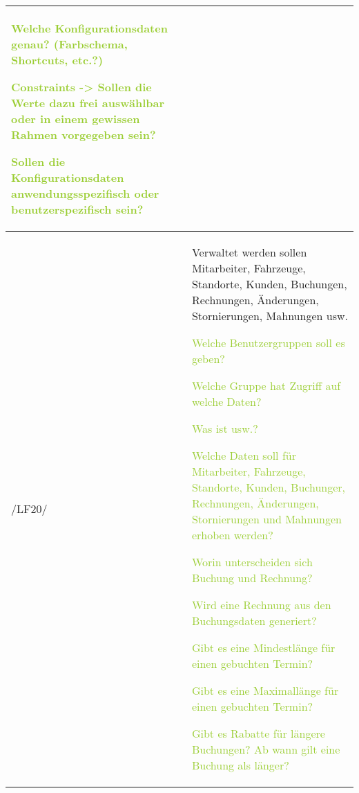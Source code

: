 \begin{tabular}{l | p{13cm}}
    \textcolor{NavyBlue}{}

    \textcolor{YellowGreen}{Welche Konfigurationsdaten genau? (Farbschema, Shortcuts, etc.?)}

    \textcolor{NavyBlue}{}

    \textcolor{YellowGreen}{Constraints -> Sollen die Werte dazu frei auswählbar oder in einem gewissen Rahmen vorgegeben sein?}

    \textcolor{NavyBlue}{}

    \textcolor{YellowGreen}{Sollen die Konfigurationsdaten anwendungsspezifisch oder benutzerspezifisch sein?} 
    
    \textcolor{NavyBlue}{}
    \\
    \hline
    /LF20/ & Verwaltet werden sollen Mitarbeiter, Fahrzeuge, Standorte, Kunden, Buchungen, Rechnungen, Änderungen, Stornierungen, Mahnungen usw.

    \textcolor{YellowGreen}{Welche Benutzergruppen soll es geben?}

    \textcolor{NavyBlue}{}

    \textcolor{YellowGreen}{Welche Gruppe hat Zugriff auf welche Daten?}

    \textcolor{NavyBlue}{}

    \textcolor{YellowGreen}{Was ist usw.?}

    \textcolor{NavyBlue}{}

    \textcolor{YellowGreen}{Welche Daten soll für Mitarbeiter, Fahrzeuge, Standorte, Kunden, Buchunger, Rechnungen, Änderungen, Stornierungen und Mahnungen erhoben werden?}

    \textcolor{NavyBlue}{}

    \textcolor{YellowGreen}{Worin unterscheiden sich Buchung und Rechnung?}

    \textcolor{NavyBlue}{}

    \textcolor{YellowGreen}{Wird eine Rechnung aus den Buchungsdaten generiert?}

    \textcolor{NavyBlue}{}

    \textcolor{YellowGreen}{Gibt es eine Mindestlänge für einen gebuchten Termin?}

    \textcolor{NavyBlue}{}

    \textcolor{YellowGreen}{Gibt es eine Maximallänge für einen gebuchten Termin?}

    \textcolor{NavyBlue}{}

    \textcolor{YellowGreen}{Gibt es Rabatte für längere Buchungen? Ab wann gilt eine Buchung als länger?}


\end{tabular}
